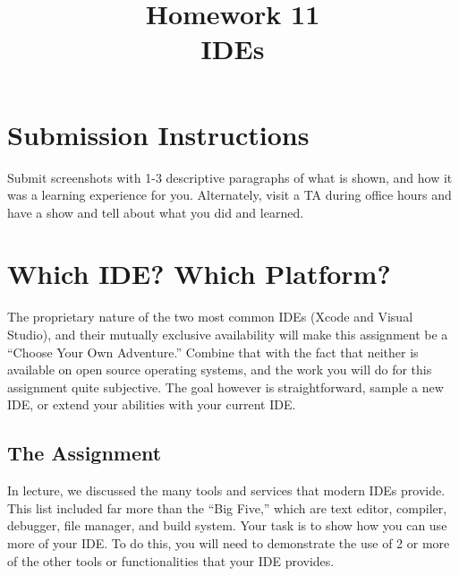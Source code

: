 \documentclass{article}
\begin{document}
\fancyfoot[C]{\color{gray} \thepage~/~\pageref*{LastPage}}
\pagestyle{fancyplain}

\title{\textbf{Homework 11\\IDEs}}
\author{\textbf{\color{red}{Due: Wednesday, November 29th, 11:59PM (Hard Deadline)}}}
\date{}
\maketitle


\section*{Submission Instructions}
Submit screenshots with 1-3 descriptive paragraphs of what is shown, and how it
was a learning experience for you. Alternately, visit a TA during office hours
and have a show and tell about what you did and learned.


\section{Which IDE? Which Platform?}

The proprietary nature of the two most common IDEs (Xcode and Visual Studio), and their mutually exclusive availability will make this assignment be a
``Choose Your Own Adventure.'' Combine that with the fact that neither is
available on open source operating systems, and the work you will do for this
assignment quite subjective. The goal however is straightforward, sample a new
IDE, or extend your abilities with your current IDE.

\subsection*{The Assignment}
In lecture, we discussed the many tools and services that modern IDEs provide.
This list included far more than the ``Big Five,'' which are text editor,
compiler, debugger, file manager, and build system. Your task is to show how
you can use more of your IDE. To do this, you will need to demonstrate the use
of 2 or more of the other tools or functionalities that your IDE provides.
\end{document}
